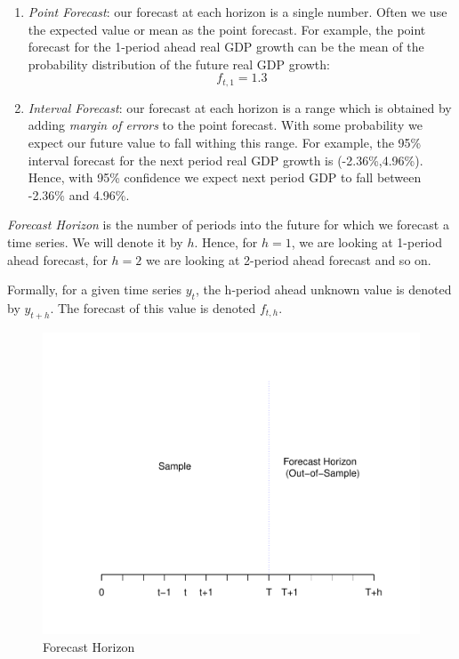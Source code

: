 \documentclass[]{book}
\theoremstyle{definition}
\theoremstyle{definition}
\theoremstyle{definition}
\theoremstyle{remark}
\let\BeginKnitrBlock\begin \let\EndKnitrBlock\end
\begin{document}
\begin{enumerate}
\def\labelenumi{\arabic{enumi}.}
\setcounter{enumi}{1}
\item
  \emph{Point Forecast}: our forecast at each horizon is a single number. Often we use the expected value or mean as the point forecast. For example, the point forecast for the 1-period ahead real GDP growth can be the mean of the probability distribution of the future real GDP growth:
  \begin{equation}
  f_{t,1}=1.3%
  \end{equation}
\item
  \emph{Interval Forecast}: our forecast at each horizon is a range which is obtained by adding \emph{margin of errors} to the point forecast. With some probability we expect our future value to fall withing this range. For example, the 95\% interval forecast for the next period real GDP growth is (-2.36\%,4.96\%). Hence, with 95\% confidence we expect next period GDP to fall between -2.36\% and 4.96\%.
\end{enumerate}

\BeginKnitrBlock{definition}[Forecast Horizon]
\protect\hypertarget{def:d2}{}{\label{def:d2} {} }
\EndKnitrBlock{definition}

\emph{Forecast Horizon} is the number of periods into the future for which we forecast a time series. We will denote it by \(h\). Hence, for \(h=1\), we are looking at 1-period ahead forecast, for \(h=2\) we are looking at 2-period ahead forecast and so on.

Formally, for a given time series \(y_t\), the h-period ahead unknown value is denoted by \(y_{t+h}\). The forecast of this value is denoted \(f_{t,h}\).

\begin{figure}

{\centering \includegraphics[width=0.8\linewidth]{bookdown-demo_files/figure-latex/ch1-figure4-1} 

}

\caption{Forecast Horizon}\label{fig:ch1-figure4}
\end{figure}
\end{document}

